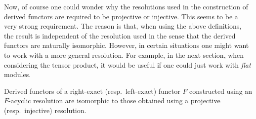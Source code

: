 	Now, of course one could wonder why the resolutions used in the construction of derived functors are required to be projective or injective. This seems to be a very strong requirement. The reason is that, when using the above definitions, the result is independent of the resolution used in the sense that the derived functors are naturally isomorphic. However, in certain situations one might want to work with a more general resolution. For example, in the next section, when considering the tensor product, it would be useful if one could just work with \textit{flat} modules.
    \begin{property}\label{homalg:acyclic_derived_functors}
        Derived functors of a right-exact (resp.~left-exact) functor $F$ constructed using an $F$-acyclic resolution are isomorphic to those obtained using a projective (resp.~injective) resolution.
    \end{property}

